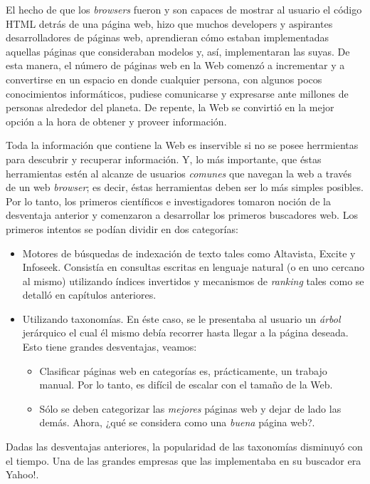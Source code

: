 	El hecho de que los \textit{browsers} fueron y son capaces de mostrar al usuario el código HTML detrás de una página web, hizo que muchos developers y aspirantes desarrolladores de páginas web, aprendieran cómo estaban implementadas aquellas páginas que consideraban modelos y, así, implementaran las suyas. De esta manera, el número de páginas web en la Web comenzó a incrementar y a convertirse en un espacio en donde cualquier persona, con algunos pocos conocimientos informáticos, pudiese comunicarse y expresarse ante millones de personas alrededor del planeta. De repente, la Web se convirtió en la mejor opción a la hora de obtener y proveer información. \par
	
	Toda la información que contiene la Web es inservible si no se posee herrmientas para descubrir y recuperar información. Y, lo más importante, que éstas herramientas estén al alcanze de usuarios \textit{comunes} que navegan la web a través de un web \textit{browser}; es decir, éstas herramientas deben ser lo más simples posibles. Por lo tanto, los primeros científicos e investigadores tomaron noción de la desventaja anterior y comenzaron a desarrollar los primeros buscadores web. Los primeros intentos se podían dividir en dos categorías:
	\begin{itemize}
		\item Motores de búsquedas de indexación de texto tales como Altavista, Excite y Infoseek. Consistía en consultas escritas en lenguaje natural (o en uno cercano al mismo) utilizando índices invertidos y mecanismos de \textit{ranking} tales como se detalló en capítulos anteriores.
		\item Utilizando taxonomías. En éste caso, se le presentaba al usuario un \textit{árbol} jerárquico el cual él mismo debía recorrer hasta llegar a la página deseada. Esto tiene grandes desventajas, veamos:
			\begin{itemize}
				\item Clasificar páginas web en categorías es, prácticamente, un trabajo manual. Por lo tanto, es difícil de escalar con el tamaño de la Web.
				\item Sólo se deben categorizar las \textit{mejores} páginas web y dejar de lado las demás. Ahora, ¿qué se considera como una \textit{buena} página web?.
			\end{itemize}
	\end{itemize}
	Dadas las desventajas anteriores, la popularidad de las taxonomías disminuyó con el tiempo. Una de las grandes empresas que las implementaba en su buscador era Yahoo!. \par
	
